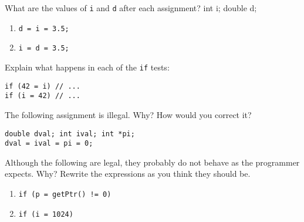 %
%
\begin{question}
What are the values of \verb|i| and \verb|d| after each assignment?
int i; double d;
\begin{enumerate}[label=(\alph*)]
^^I\item \verb|d = i = 3.5;|
^^I\item \verb|i = d = 3.5;|
\end{enumerate}
\end{question}

\begin{question}
Explain what happens in each of the \verb|if| tests:
\begin{lstlisting}
if (42 = i) // ...
if (i = 42) // ...
\end{lstlisting}
\end{question}

\begin{question}
The following assignment is illegal. Why? How would you correct it?
\begin{lstlisting}
double dval; int ival; int *pi;
dval = ival = pi = 0;
\end{lstlisting}
\end{question}

\begin{question}
Although the following are legal, they probably do not
behave as the programmer expects. Why? Rewrite the expressions as you
think they should be.
\begin{enumerate}[label=(\alph*)]
^^I\item \verb|if (p = getPtr() != 0)|
^^I\item \verb|if (i = 1024)|
\end{enumerate}
\end{question}
